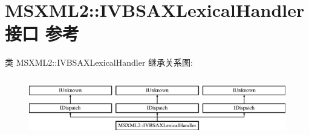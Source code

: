 \hypertarget{interface_m_s_x_m_l2_1_1_i_v_b_s_a_x_lexical_handler}{}\section{M\+S\+X\+M\+L2\+:\+:I\+V\+B\+S\+A\+X\+Lexical\+Handler接口 参考}
\label{interface_m_s_x_m_l2_1_1_i_v_b_s_a_x_lexical_handler}
类 M\+S\+X\+M\+L2\+:\+:I\+V\+B\+S\+A\+X\+Lexical\+Handler 继承关系图\+:\begin{figure}[H]
\begin{center}
\leavevmode
\includegraphics[height=2.666667cm]{interface_m_s_x_m_l2_1_1_i_v_b_s_a_x_lexical_handler}
\end{center}
\end{figure}
